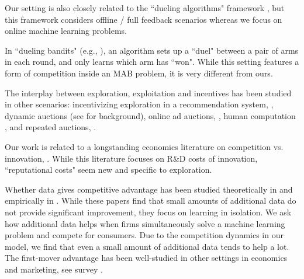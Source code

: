 \documentclass[../competing_bandits_with_appendix.tex]{subfiles}
\begin{document}
Our setting is also closely related to the ``dueling algorithms" framework \cite{DuelingAlgs-stoc11}, but this framework considers offline / full feedback scenarios whereas we focus on online machine learning problems.


In ``dueling bandits" (e.g., \cite{Yue-dueling-icml09, Yue-dueling12}), an algorithm sets up a ``duel" between a pair of arms in each round, and only learns which arm has ``won". While this setting features a form of competition inside an MAB problem, it is very different from ours.


The interplay between exploration, exploitation and incentives has been studied in other scenarios: incentivizing exploration in a recommendation system,
    \eg \cite{Kremer-JPE14,Frazier-ec14,Che-13,ICexploration-ec15,Bimpikis-exploration-ms17},
dynamic auctions
    (see \cite{DynAuctions-survey10} for background),
online ad auctions, \eg
    \cite{MechMAB-ec09,DevanurK09,NSV08,Transform-ec10-jacm},
human computation
    \cite{RepeatedPA-ec14,Ghosh-itcs13,Krause-www13},
and repeated auctions, \eg
    \cite{Amin-auctions-nips13,Amin-auctions-nips14,Jieming-ec18}.


Our work is related to a longstanding economics literature on competition vs. innovation, \eg \cite{Schumpeter-42,barro2004economic,Aghion-QJE05}. While this literature focuses on R\&D costs of innovation, ``reputational costs" seem new and specific to exploration.


Whether data gives competitive advantage
has been studied theoretically in \cite{varian2018artificial,
  lambrecht2015can} and empirically in
\cite{bajari2018impact}.
While these papers find that small amounts
  of additional data do not provide significant improvement,
  they focus on learning in isolation.
We ask how additional data helps when firms simultaneously solve a machine learning problem and compete for consumers. Due to the competition dynamics in our model, we find that even a small amount of additional data tends to help a lot. The first-mover advantage has been well-studied in other settings in economics and marketing, see survey \cite{kerin1992first}.
\end{document}
